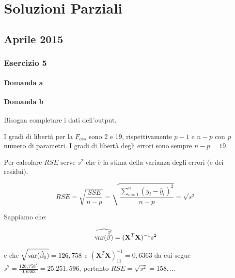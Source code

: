 \chapter{Soluzioni Parziali}

\section{Aprile 2015}

\subsection{Esercizio 5}

\subsubsection{Domanda a}


\subsubsection{Domanda b}

Bisogna completare i dati dell'output.

I gradi di libertà per la $ F_{oss} $ sono 2 e 19, rispettivamente $ p-1 $ e $ n-p $ con \textit{p} numero di parametri. I gradi di libertà degli errori sono sempre $ n-p = 19 $.

Per calcolare $ RSE $ serve $ s^2 $ che è la stima della varianza degli errori (e dei residui).

$$
RSE = \sqrt{\frac{SSE}{n-p}} = \sqrt{\frac{\sum\limits_{i=1}^n (y_i - \hat{y}_i)^2}{n-p}} = \sqrt{s^2} 
$$

Sappiamo che:

$$
\widehat{\text{var}(\vec{\hat{\beta}})} = (\textbf{X}^T\textbf{X})^{-1}s^2
$$

e che $ \sqrt{\text{var} (\hat{\beta}_0)} = 126,758$ e $(\textbf{X}^T\textbf{X})_{11}^{-1} = 0,6363  $ da cui segue $ s^2 = \frac{126,758^2}{0,6363} =  25.251,596$, pertanto $ RSE = \sqrt{s^2} = 158,..$.